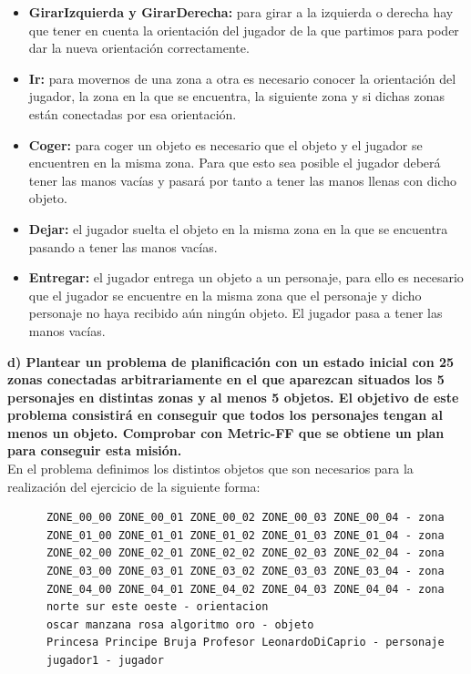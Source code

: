 \documentclass[12pt]{article}
\begin{document}
\begin{itemize}
 \item \textbf{GirarIzquierda y GirarDerecha:} para girar a la izquierda o derecha hay que tener en cuenta la orientación del jugador de la que partimos para poder dar la nueva orientación correctamente. 
 \item \textbf{Ir:} para movernos de una zona a otra es necesario conocer la orientación del jugador, la zona en la que se encuentra, la siguiente zona y si dichas zonas están conectadas por esa orientación.
 \item \textbf{Coger:} para coger un objeto es necesario que el objeto y el jugador se encuentren en la misma zona. Para que esto sea posible el jugador deberá tener las manos vacías y pasará por tanto a tener las manos llenas con dicho objeto.
 \item \textbf{Dejar:} el jugador suelta el objeto en la misma zona en la que se encuentra pasando a tener las manos vacías.
 \item \textbf{Entregar:} el jugador entrega un objeto a un personaje, para ello es necesario que el jugador se encuentre en la misma zona que el personaje y dicho personaje no haya recibido aún ningún objeto. El jugador pasa a tener las manos vacías.
\end{itemize}

\textbf{d) Plantear un problema de planificación con un estado inicial con 25 zonas
conectadas arbitrariamente en el que aparezcan situados los 5 personajes en
distintas zonas y al menos 5 objetos. El objetivo de este problema consistirá en
conseguir que todos los personajes tengan al menos un objeto. Comprobar
con Metric-FF que se obtiene un plan para conseguir esta misión.}\\

En el problema definimos los distintos objetos que son necesarios para la realización del ejercicio de la siguiente forma:

\begin{verbatim}
      ZONE_00_00 ZONE_00_01 ZONE_00_02 ZONE_00_03 ZONE_00_04 - zona
      ZONE_01_00 ZONE_01_01 ZONE_01_02 ZONE_01_03 ZONE_01_04 - zona
      ZONE_02_00 ZONE_02_01 ZONE_02_02 ZONE_02_03 ZONE_02_04 - zona
      ZONE_03_00 ZONE_03_01 ZONE_03_02 ZONE_03_03 ZONE_03_04 - zona
      ZONE_04_00 ZONE_04_01 ZONE_04_02 ZONE_04_03 ZONE_04_04 - zona
      norte sur este oeste - orientacion
      oscar manzana rosa algoritmo oro - objeto
      Princesa Principe Bruja Profesor LeonardoDiCaprio - personaje
      jugador1 - jugador
\end{verbatim}
\end{document}
